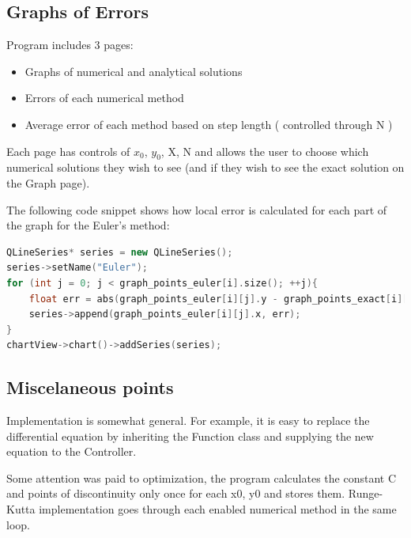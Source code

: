 \documentclass[12pt]{article}
\begin{document}
\newpage

\subsection*{Graphs of Errors}
Program includes 3 pages: 
\begin{itemize}
\item Graphs of numerical and analytical solutions
\item Errors of each numerical method
\item Average error of each method based on step length ( controlled through N )
\end{itemize}
Each page has controls of $x_0$, $y_0$, X, N and allows the user
to choose which numerical solutions they wish to see 
(and if they wish to see the exact solution on the Graph page).

The following code snippet shows how local error is calculated for each 
part of the graph for the Euler's method:
\begin{lstlisting}[language=C++]
QLineSeries* series = new QLineSeries();
series->setName("Euler");
for (int j = 0; j < graph_points_euler[i].size(); ++j){
    float err = abs(graph_points_euler[i][j].y - graph_points_exact[i][j].y);
    series->append(graph_points_euler[i][j].x, err);
}
chartView->chart()->addSeries(series);
\end{lstlisting}

\subsection*{Miscelaneous points}
Implementation is somewhat general. For example, it is easy to replace 
the differential equation by inheriting the Function class and supplying the 
new equation to the Controller.

Some attention was paid to optimization, 
the program calculates the constant C and points of 
discontinuity only once for each x0, y0 and stores them.
Runge-Kutta implementation goes through each enabled numerical method 
in the same loop.
\end{document}
